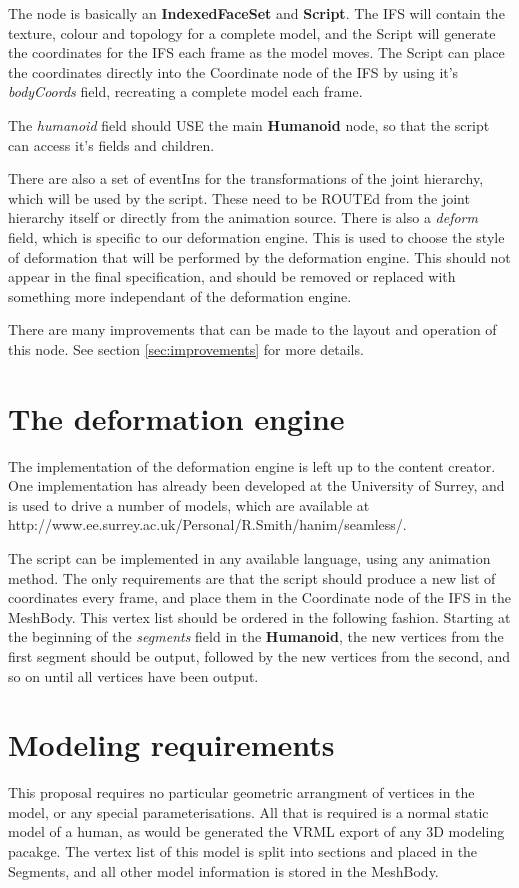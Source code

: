 \documentclass[12pt,oneside,a4paper,titlepage]{article}
\begin{document}
The node is basically an {\bf IndexedFaceSet} and {\bf Script}. The IFS will contain the texture, colour and topology for a complete model, and the Script will generate the coordinates for the IFS each frame as the model moves. The Script can place the coordinates directly into the Coordinate node of the IFS by using it's {\it bodyCoords} field, recreating a complete model each frame.

The {\it humanoid} field should USE the main {\bf Humanoid} node, so that the script can access it's fields and children.

There are also a set of eventIns for the transformations of the joint hierarchy, which will be used by the script. These need to be ROUTEd from the joint hierarchy itself or directly from the animation source. There is also a {\it deform} field, which is specific to our deformation engine. This is used to choose the style of deformation that will be performed by the deformation engine. This should not appear in the final specification, and should be removed or replaced with something more independant of the deformation engine.

There are many improvements that can be made to the layout and operation of this node. See section \ref{sec:improvements} for more details.

\section{\label{sec:deformation}The deformation engine}
The implementation of the deformation engine is left up to the content creator. One implementation has already been developed at the University of Surrey, and is used to drive a number of models, which are available at http://www.ee.surrey.ac.uk/Personal/R.Smith/hanim/seamless/.

The script can be implemented in any available language, using any animation method. The only requirements are that the script should produce a new list of coordinates every frame, and place them in the Coordinate node of the IFS in the MeshBody. This vertex list should be ordered in the following fashion. Starting at the beginning of the {\it segments} field in the {\bf Humanoid}, the new vertices from the first segment should be output, followed by the new vertices from the second, and so on until all vertices have been output.

\section{\label{sec:modeling}Modeling requirements}
This proposal requires no particular geometric arrangment of vertices in the model, or any special parameterisations. All that is required is a normal static model of a human, as would be generated the VRML export of any 3D modeling pacakge. The vertex list of this model is split into sections and placed in the Segments, and all other model information is stored in the MeshBody.
\end{document}
